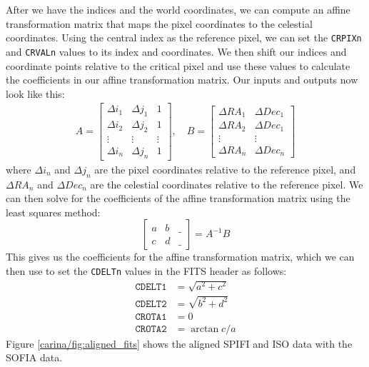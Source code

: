 After we have the indices and the world coordinates, we can compute an affine transformation matrix that maps the pixel coordinates to the celestial coordinates.
Using the central index as the reference pixel, we can set the \texttt{CRPIXn} and \texttt{CRVALn} values to its index and coordinates.
We then shift our indices and coordinate points relative to the critical pixel and use these values to calculate the coefficients in our affine transformation matrix.
Our inputs and outputs now look like this:
\begin{align}
    A = \begin{bmatrix}
        \Delta i_1 & \Delta j_1 & 1 \\
        \Delta i_2 & \Delta j_2 & 1 \\
        \vdots & \vdots & \vdots \\
        \Delta i_n & \Delta j_n & 1
    \end{bmatrix}, \quad
    B = \begin{bmatrix}
        \Delta RA_1 & \Delta Dec_1\\
        \Delta RA_2 & \Delta Dec_1\\
        \vdots & \vdots \\
        \Delta RA_n & \Delta Dec_n
    \end{bmatrix}
\end{align}
where $\Delta i_n$ and $\Delta j_n$ are the pixel coordinates relative to the reference pixel, and $\Delta RA_n$ and $\Delta Dec_n$ are the celestial coordinates relative to the reference pixel.
We can then solve for the coefficients of the affine transformation matrix using the least squares method:
\begin{equation}
    \begin{bmatrix}
        a & b & \_ \\
        c & d & \_
    \end{bmatrix} = A^{-1}B
\end{equation}
This gives us the coefficients for the affine transformation matrix, which we can then use to set the \texttt{CDELTn} values in the FITS header as follows:
\begin{align}
    \texttt{CDELT1} &= \sqrt{a^2 + c^2} \\
    \texttt{CDELT2} &= \sqrt{b^2 + d^2} \\
    \texttt{CROTA1} &= 0 \\
    \texttt{CROTA2} &= \arctan{c/a}
\end{align}
Figure \ref{carina/fig:aligned_fits} shows the aligned SPIFI and ISO data with the SOFIA data.

